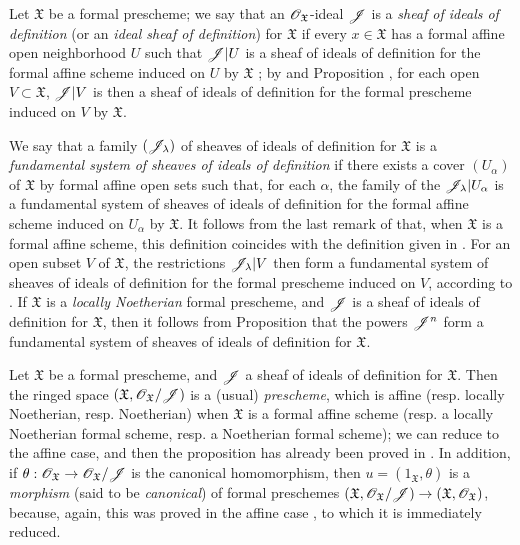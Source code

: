 \begin{env}[10.5.1]
\label{1.10.5.1}
Let $\mathfrak{X}$ be a formal prescheme; we say that an $\mathscr{O}_\mathfrak{X}$-ideal $\mathscr{J}$ is a \emph{sheaf of ideals of definition} (or an \emph{ideal sheaf of definition}) for $\mathfrak{X}$ if every $x\in\mathfrak{X}$ has a formal affine open neighborhood $U$ such that $\mathscr{J}|U$ is a sheaf of ideals of definition for the formal affine scheme induced on $U$ by $\mathfrak{X}$ ; by  and Proposition , for each open $V\subset\mathfrak{X}$, $\mathscr{J}|V$ is then a sheaf of ideals of definition for the formal prescheme induced on $V$ by $\mathfrak{X}$.

We say that a family $(\mathscr{J}_\lambda)$ of sheaves of ideals of definition for $\mathfrak{X}$ is a \emph{fundamental system}
\emph{of sheaves of ideals of definition} if there exists a cover $(U_\alpha)$ of $\mathfrak{X}$ by formal affine open sets such that, for each $\alpha$, the family of the $\mathscr{J}_\lambda|U_\alpha$ is a fundamental system of sheaves of ideals of definition  for the formal affine scheme induced on $U_\alpha$ by $\mathfrak{X}$.
It follows from the last remark of  that, when $\mathfrak{X}$ is a formal affine scheme, this definition coincides with the definition given in .
For an open subset $V$ of $\mathfrak{X}$, the restrictions $\mathscr{J}_\lambda|V$ then form a fundamental system of sheaves of ideals of definition for the formal prescheme induced on $V$, according to .
If $\mathfrak{X}$ is a \emph{locally Noetherian} formal prescheme, and $\mathscr{J}$ is a sheaf of ideals of definition for $\mathfrak{X}$, then it follows from Proposition  that the powers $\mathscr{J}^n$ form a fundamental system of sheaves of ideals of definition for $\mathfrak{X}$.
\end{env}

\begin{env}[10.5.2]
\label{1.10.5.2}
Let $\mathfrak{X}$ be a formal prescheme, and $\mathscr{J}$ a sheaf of ideals of definition for $\mathfrak{X}$.
Then the ringed space $(\mathfrak{X},\mathscr{O}_\mathfrak{X}/\mathscr{J})$ is a (usual) \emph{prescheme}, which is affine (resp. locally Noetherian, resp. Noetherian) when $\mathfrak{X}$ is a formal affine scheme (resp. a locally Noetherian formal scheme, resp. a Noetherian formal scheme);  we can reduce to the affine case, and then the proposition has already been proved in .
In addition, if $\theta:\sh{O}_\mathfrak{X}\to\sh{O}_\mathfrak{X}/\sh{J}$ is the canonical homomorphism, then $u=(1_\mathfrak{X},\theta)$ is a \emph{morphism} (said to be \emph{canonical}) of formal preschemes $(\mathfrak{X},\sh{O}_\mathfrak{X}/\sh{J})\to(\mathfrak{X},\sh{O}_\mathfrak{X})$, because, again, this was proved in the affine case , to which it is immediately reduced.
\end{env}

